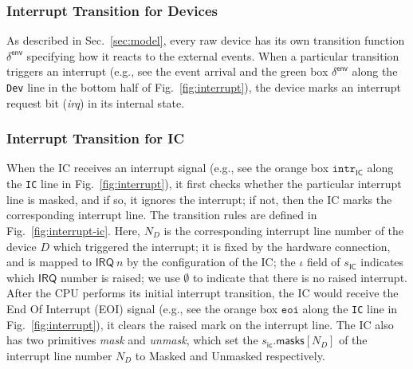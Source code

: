 \subsubsection{Interrupt Transition for Devices}

As described in Sec.~\ref{sec:model}, every raw device has its own
transition function $\delta^{\textsf{env}}$ specifying how it reacts
to the external events. When a particular transition triggers an
interrupt (e.g., see the event arrival and the green box
$\delta^{\textsf{env}}$ along the {\tt Dev} line in the bottom half of
Fig.~\ref{fig:interrupt}), the device marks an interrupt request bit
({\it irq}) in its internal state.


\subsubsection{Interrupt Transition for IC}
When the IC receives an interrupt signal (e.g., see the orange box
$\texttt{intr}_{\textsf{IC}}$ along the {\tt IC} line in
Fig.~\ref{fig:interrupt}), it first checks whether the particular
interrupt line is masked, and if so, it ignores the interrupt; if not,
then the IC marks the corresponding interrupt line.  The
transition rules are defined in Fig.~\ref{fig:interrupt-ic}.  Here,
$N_D$ is the corresponding interrupt line number of the device $D$
which triggered the interrupt; it is fixed by the hardware connection,
and is mapped to $\textsf{IRQ} ~ n$ by the configuration of the IC;
the $\iota$ field of $s_{\textsf{IC}}$ indicates which $\textsf{IRQ}$
number is raised; we use $\emptyset$ to indicate that there is no
raised interrupt. After the CPU performs its initial interrupt
transition, the IC would receive the End Of Interrupt (EOI) signal
(e.g., see the orange box $\texttt{eoi}$ along the {\tt IC} line in
Fig.~\ref{fig:interrupt}), it clears the raised mark on the interrupt
line.  The IC also has two primitives {\it mask} and {\it unmask},
which set the $s_{\textsf{ic}}.\textsf{masks}[N_D]$ of the interrupt
line number $N_D$ to \textsf{Masked} and \textsf{Unmasked}
respectively.




